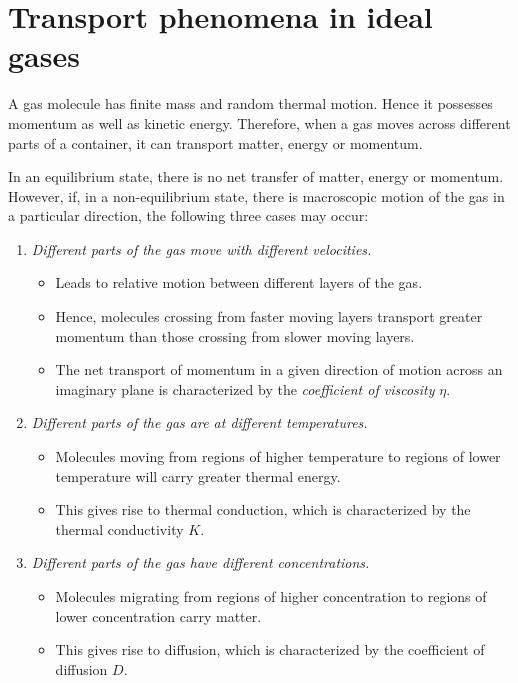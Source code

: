 \section{Transport phenomena in ideal gases}
	A gas molecule has finite mass and random thermal motion. Hence it possesses momentum as well as kinetic energy. Therefore, when a gas moves across different parts of a container, it can transport matter, energy or momentum.
	
	In an equilibrium state, there is no net transfer of matter, energy or momentum. However, if, in a non-equilibrium state, there is macroscopic motion of the gas in a particular direction, the following three cases may occur:
	\begin{enumerate}
		\item \emph{Different parts of the gas move with different velocities.}
		\begin{itemize}
			\item Leads to relative motion between different layers of the gas.
			\item Hence, molecules crossing from faster moving layers transport greater momentum than those crossing from slower moving layers.
			\item The net transport of momentum in a given direction of motion across an imaginary plane is characterized by the \emph{coefficient of viscosity} $\eta$.
		\end{itemize}
		
		\item \emph{Different parts of the gas are at different temperatures.}
		\begin{itemize}
			\item Molecules moving from regions of higher temperature to regions of lower temperature will carry greater thermal energy.
			\item This gives rise to thermal conduction, which is characterized by the thermal conductivity $K$.
		\end{itemize}
		
		\item \emph{Different parts of the gas have different concentrations.}
		\begin{itemize}
			\item Molecules migrating from regions of higher concentration to regions of lower concentration carry matter.
			\item This gives rise to diffusion, which is characterized by the coefficient of diffusion $D$.
		\end{itemize}
	\end{enumerate}
	
